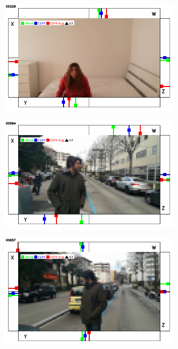 \begin{figure}[H]
\begin{center}
\begin{subfigure}[h]{0.49\textwidth}
		\end{subfigure}
		\hfill
		\begin{subfigure}[h]{0.49\textwidth}
			\centering
			\includegraphics[width=0.98\textwidth]{"contents/images/qualitative-videos/perfect2-house01-5329"}
		\end{subfigure}
		\vfill
		\begin{subfigure}[h]{0.49\textwidth}
			\centering
			\includegraphics[width=0.98\textwidth]{"contents/images/qualitative-videos/perfect3-street01-64"}
		\end{subfigure}
		\hfill
		\begin{subfigure}[h]{0.49\textwidth}
			\centering
			\includegraphics[width=0.98\textwidth]{"contents/images/qualitative-videos/perfect3-street01-657"}

\end{subfigure}
\end{center}
\end{figure}
